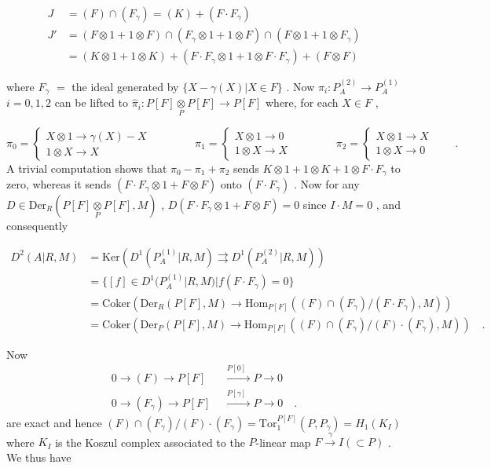
 
\begin{align*}
J &= (F) \cap (F_\gamma) = (K) + (F\cdot F_\gamma)\\
J' &= (F\otimes 1 + 1\otimes F) \cap (F_\gamma\otimes 1 + 1\otimes F) \cap (F\otimes 1 + 1\otimes F_\gamma)\\
&= (K\otimes 1 + 1\otimes K) + (F\cdot F_\gamma\otimes 1 + 1\otimes F\cdot F_\gamma) + (F\otimes F)
\end{align*}

where  $F_\gamma$ $=$ the ideal generated by  $\{X - \gamma(X)|X \in F\}$  . Now  $\pi_i : P_A^{(2)} \to P_A^{(1)}$  $i = 0, 1, 2$  can be lifted to  $\hat{\pi}_i : P[F]\underset{P}{\otimes}P[F] \to P[F]$  where, for each  $X \in F$  ,

$$\pi_0 = \begin{cases} X\otimes 1 \to \gamma(X) - X\\[3ex] 1\otimes X \to X\end{cases}\qquad\qquad \pi_1 = \begin{cases} X\otimes 1 \to 0\\[3ex] 1\otimes X \to X\end{cases}\qquad\qquad \pi_2 = \begin{cases} X\otimes 1 \to X\\[3ex] 1\otimes X \to 0\end{cases}\qquad .$$
A trivial computation shows that  $\pi_0 - \pi_1 + \pi_2$  sends  $K\otimes 1 + 1\otimes K + 1\otimes F\cdot F_\gamma$  to zero, whereas it sends  $(F\cdot F_\gamma\otimes 1 + F\otimes F)$  onto  $(F\cdot F_\gamma)$  . Now for any $D \in \mathrm{Der}_R(P[F]\underset{P}{\otimes}P[F], M)$  ,  $D(F\cdot F_\gamma\otimes 1 + F\otimes F) = 0$  since  $I\cdot M = 0$  , and consequently

\begin{align*}
D^2(A|R, M) &= \mathrm{Ker}(D^1(P_A^{(1)}|R, M) \rightrightarrows D^1(P_A^{(2)}|R, M))\\
&= \{[f] \in D^1(P_A^{(1)}|R, M)|f(F\cdot F_\gamma) = 0\}\\
&= \mathrm{Coker}(\mathrm{Der}_R(P[F], M) \to \mathrm{Hom}_{P[F]}((F) \cap (F_\gamma)/(F\cdot F_\gamma), M))\\
&= \mathrm{Coker}(\mathrm{Der}_P(P[F], M) \to \mathrm{Hom}_{P[F]}((F) \cap (F_\gamma)/(F)\cdot(F_\gamma), M))\quad .
\end{align*}

Now
$$\begin{aligned}
0 \to (F) \to P[F] &\xrightarrow{\;\;P[0]\;\;} P \to 0\\
0 \to (F_\gamma) \to P[F] &\xrightarrow{\;\;P[\gamma]\;\;} P \to 0 \quad .
\end{aligned}$$
are exact and hence  $(F) \cap (F_\gamma)/(F)\cdot(F_\gamma) = \mathrm{Tor}_1^{P[F]}(P, P_\gamma) = H_1(K_I)$  where  $K_I$  is the Koszul complex associated  to the $P$-linear map  $F \xrightarrow{\gamma} I(\subset P)$  . We thus have

